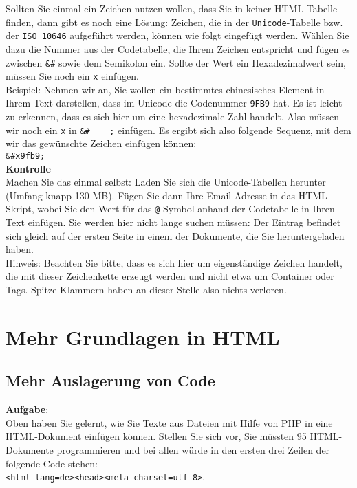 Sollten Sie einmal ein Zeichen nutzen wollen, dass Sie in keiner HTML-Tabelle finden, dann gibt es noch eine Lösung: Zeichen, die in der \verb|Unicode|-Tabelle bzw. der \verb|ISO 10646| aufgeführt werden, können wie folgt eingefügt werden. Wählen Sie dazu die Nummer aus der Codetabelle, die Ihrem Zeichen entspricht und fügen es zwischen \verb|&#| sowie dem Semikolon ein. Sollte der Wert ein Hexadezimalwert sein, müssen Sie noch ein \verb|x| einfügen.\\

Beispiel: Nehmen wir an, Sie wollen ein bestimmtes chinesisches Element in Ihrem Text darstellen, dass im Unicode die Codenummer \verb|9FB9| hat. Es ist leicht zu erkennen, dass es sich hier um eine hexadezimale Zahl handelt. Also müssen wir noch ein \verb|x| in \verb|&#    ;| einfügen. Es ergibt sich also folgende Sequenz, mit dem wir das gewünschte Zeichen einfügen können:\\

\verb|&#x9fb9;|\\

\textbf{Kontrolle}\\

Machen Sie das einmal selbst: Laden Sie sich die Unicode-Tabellen herunter (Umfang knapp 130 MB). Fügen Sie dann Ihre Email-Adresse in das HTML-Skript, wobei Sie den Wert für das \verb|@|-Symbol anhand der Codetabelle in Ihren Text einfügen. Sie werden hier nicht lange suchen müssen: Der Eintrag befindet sich gleich auf der ersten Seite in einem der Dokumente, die Sie heruntergeladen haben.\\

Hinweis: Beachten Sie bitte, dass es sich hier um eigenständige Zeichen handelt, die mit dieser Zeichenkette erzeugt werden und nicht etwa um Container oder Tags. Spitze Klammern haben an dieser Stelle also nichts verloren.

\section{Mehr Grundlagen in HTML}

\subsection{Mehr Auslagerung von Code}

\textbf{Aufgabe}:\\

Oben haben Sie gelernt, wie Sie Texte aus Dateien mit Hilfe von PHP in eine HTML-Dokument einfügen können. Stellen Sie sich vor, Sie müssten 95 HTML-Dokumente programmieren und bei allen würde in den ersten drei Zeilen der folgende Code stehen:\\ \verb|<html lang=de><head><meta charset=utf-8>|.\\

